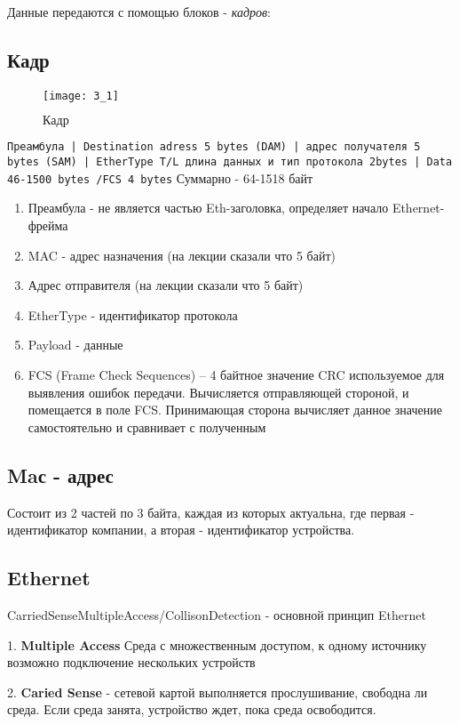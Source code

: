 \documentclass[a4paper,10pt]{article}
\begin{document}
	Данные передаются с помощью блоков - \emph{кадров}:
	
	\subsection{Кадр}
	\begin{figure}[h]
		\texttt{[image: 3\_1]}
		\caption{$Кадр$}
	\end{figure}
	\newpage
	\texttt{Преамбула | Destination adress 5 bytes (DAM) | адрес получателя 5 bytes (SAM) | EtherType T/L длина данных и тип протокола 2bytes | Data 46-1500 bytes /FCS 4 bytes}
	Суммарно - 64-1518 байт
	
	\begin{enumerate}
		\item Преамбула - не является частью Eth-заголовка, определяет начало Ethernet-фрейма
		\item MAC - адрес назначения (на лекции сказали что 5 байт)
		\item Адрес отправителя (на лекции сказали что 5 байт)
		\item EtherType - идентификатор протокола
		\item Payload - данные
		\item FCS (Frame Check Sequences) – 4 байтное значение CRC используемое для выявления ошибок передачи. Вычисляется отправляющей стороной, и помещается в поле FCS. Принимающая сторона вычисляет данное значение самостоятельно и сравнивает с полученным
	\end{enumerate}
	
	\subsection{Maс - адрес}
	
	Состоит из 2 частей по 3 байта, каждая из которых актуальна, где первая - идентификатор компании, а вторая - идентификатор устройства.
	
	\subsection{Ethernet}
	CarriedSenseMultipleAccess/CollisonDetection - основной принцип Ethernet
	
	1. \textbf{Multiple Access} Среда с множественным доступом, к одному источнику возможно подключение нескольких устройств
	
	2. \textbf{Caried Sense} - сетевой картой выполняется прослушивание, свободна ли среда. Если среда занята, устройство ждет, пока среда освободится.
	
\end{document}

